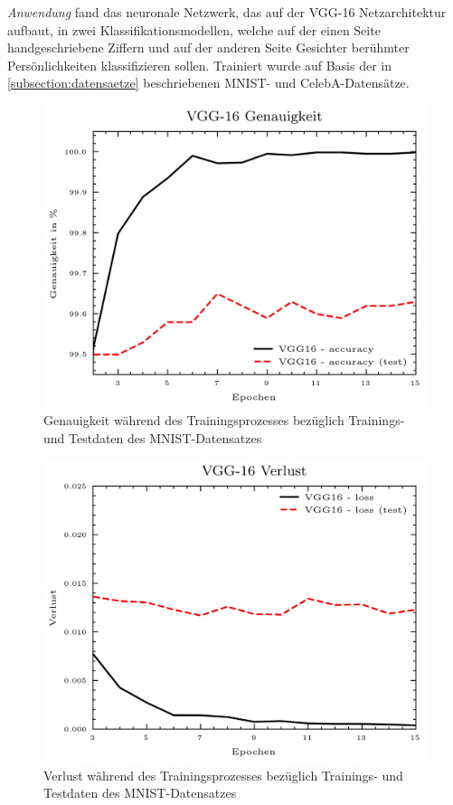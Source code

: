 \textit{Anwendung} fand das neuronale Netzwerk, das auf der VGG-16 Netzarchitektur aufbaut, in zwei Klassifikationsmodellen, welche auf der einen Seite handgeschriebene Ziffern und auf der anderen Seite Gesichter berühmter Persönlichkeiten klassifizieren sollen. Trainiert wurde auf Basis der in \ref{subsection:datensaetze} beschriebenen MNIST- und CelebA-Datensätze.


\begin{table}[h]
	\centering
	\renewcommand{\arraystretch}{1.5}
	\caption{Hyperparameter des \glqq normalen\grqq{} Trainings bezüglich der angegebenen Datensätze}
	\label{tab:nn_train}
\end{table}

\begin{figure}[H]
	\centering
	\includegraphics[width=0.5\linewidth]{Bilder/mnist_nn_acc.png}
	\caption{Genauigkeit während des Trainingsprozesses bezüglich Trainings- und Testdaten des MNIST-Datensatzes}
	\label{img:mnist_nn_acc}
\end{figure}

\begin{figure}[H]
	\centering
	\includegraphics[width=0.5\linewidth]{Bilder/mnist_nn_loss.png}
	\caption{Verlust während des Trainingsprozesses bezüglich Trainings- und Testdaten des MNIST-Datensatzes}
	\label{img:mnist_nn_loss}
\end{figure}

